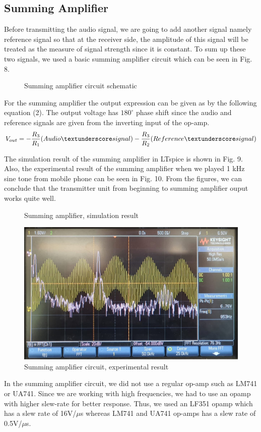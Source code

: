 \documentclass[conference]{IEEEtran}
\begin{document}
\subsection{Summing Amplifier}
Before transmitting the audio signal, we are going to add another signal namely reference signal so that at the receiver side, the amplitude of this signal will be treated as the measure of signal strength since it is constant. To sum up these two signals, we used a basic summing amplifier circuit which can be seen in Fig. 8.
 \begin{figure}[H]
   \centerline{}
    \caption{Summing amplifier circuit schematic}
\end{figure} 
\par For the summing amplifier the output expression can be given as by the following equation (2). The output voltage has \(180^\circ\) phase shift since the audio and reference signals are given from the inverting input of the op-amp.  
\begin{equation}\label{eq:3}
         V_{out} = -\frac{R_3}{R_1} \mbox{(Audio\textunderscore signal)} - \frac{R_3}{R_2} \mbox{(Reference\textunderscore signal)}
 \end{equation}
 \par The simulation result of the summing amplifier in LTspice is shown in Fig. 9. Also, the experimental result of the summing amplifier when we played 1 kHz sine tone from mobile phone can be seen in Fig. 10. From the figures, we can conclude that the transmitter unit from beginning to summing amplifier ouput works 
 quite well.  
  \begin{figure}[H]
   \centerline{}
    \caption{Summing amplifier, simulation result}
\end{figure} 
 \begin{figure}[H]
   \centerline{\includegraphics[scale=0.13]{summing.png}}
    \caption{Summing amplifier circuit, experimental result}
\end{figure} 
 \par In the summing amplifier circuit, we did not use a regular op-amp such as LM741 or UA741. Since we are working with high frequencies, we had to use an opamp with higher slew-rate for better response. Thus, we used an LF351 \cite{LF351} opamp which has a slew rate of 16V/\(\mu\)s whereas LM741 \cite{LM741} and UA741 \cite{uA741} op-amps has a slew rate of 0.5V/\(\mu\)s.
\end{document}
